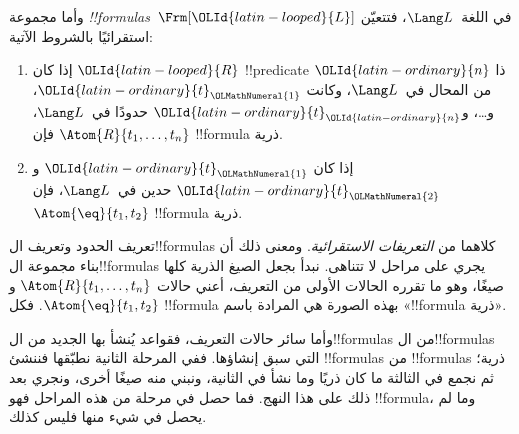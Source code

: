\documentclass[../../../include/open-logic-section]{subfiles}
\begin{document}
\begin{defn}[الصيغ]
وأما مجموعة \emph{!!{formula}s}~$\Frm[{\OLId{latin-looped}{L}}]$ في اللغة~$\Lang L$،
فتتعيّن استقرائيًا بالشروط الآتية:
\begin{enumerate}


\item إذا كان ${\OLId{latin-looped}{R}}$ !!{predicate} ذا ${\OLId{latin-ordinary}{n}}$ من المحال في~$\Lang L$، وكانت
  ${\OLId{latin-ordinary}{t}}_{\OLMathNumeral{1}}$، و\dots، و${\OLId{latin-ordinary}{t}}_{\OLId{latin-ordinary}{n}}$ حدودًا في~$\Lang L$، فإن
  $\Atom{R}{t_1,\ldots, t_n}$ !!{formula} ذرية.

\item إذا كان ${\OLId{latin-ordinary}{t}}_{\OLMathNumeral{1}}$ و${\OLId{latin-ordinary}{t}}_{\OLMathNumeral{2}}$ حدين في~$\Lang L$، فإن
  $\Atom{\eq}{t_1, t_2}$ !!{formula} ذرية.








\end{enumerate}
\end{defn}

\begin{explain}
تعريف الحدود وتعريف ال!!{formula}s كلاهما من
\emph{التعريفات الاستقرائية}. ومعنى ذلك أن بناء مجموعة
ال!!{formula}s يجري على مراحل لا تتناهى. نبدأ بجعل الصيغ الذرية
كلها صيغًا، وهو ما تقرره الحالات الأولى من التعريف، أعني حالات
%
%
$\Atom{R}{t_1,\dots,t_n}$ و$\Atom{\eq}{t_1,t_2}$. فكل
!!{formula} بهذه الصورة هي المرادة باسم «!!{formula} ذرية».

وأما سائر حالات التعريف، فقواعد يُنشأ بها الجديد من ال!!{formula}s
من ال!!{formula}s التي سبق إنشاؤها. ففي المرحلة الثانية نطبّقها
فننشئ !!{formula}s من !!{formula}s ذرية؛ ثم نجمع في الثالثة ما
كان ذريًا وما نشأ في الثانية، ونبني منه صيغًا أخرى، ونجري بعد ذلك
على هذا النهج. فما حصل في مرحلة من هذه المراحل فهو !!{formula}،
وما لم يحصل في شيء منها فليس كذلك.
\end{explain}
\end{document}
